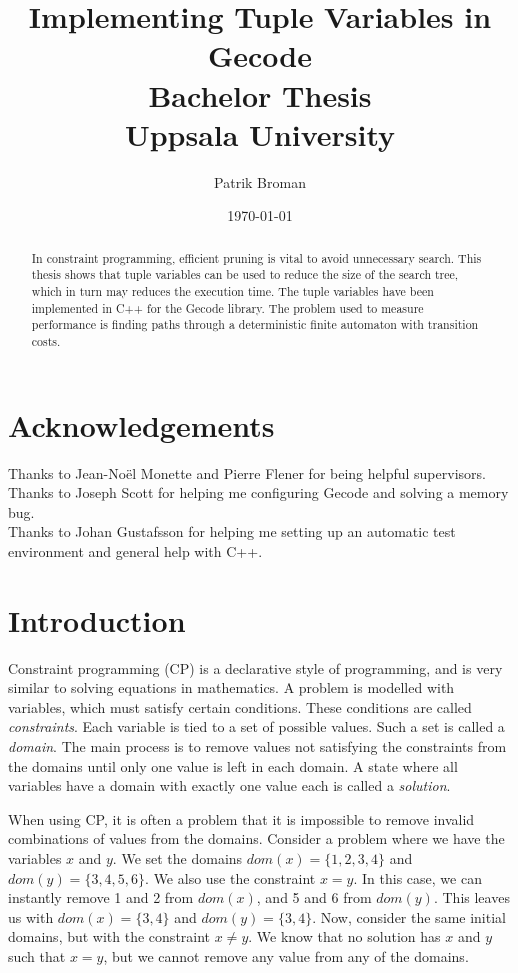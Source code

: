 \documentclass[a4paper,11pt]{article}
\title{\textbf{Implementing Tuple Variables in Gecode\\
	Bachelor Thesis \\
    Uppsala University  \\
  }
}
\author{Patrik Broman}
\date{\today}
\begin{document}
\maketitle
{}

\begin{abstract}

In constraint programming, efficient pruning is vital to avoid unnecessary search. This thesis shows that tuple variables can be used to reduce the size of the search tree, which in turn may reduces the execution time. The tuple variables have been implemented in C++ for the Gecode library. The problem used to measure performance is finding paths through a deterministic finite automaton with transition costs.

\end{abstract}

\setcounter{tocdepth}{2}
\tableofcontents
\pagestyle{plain}

\section*{Acknowledgements}
Thanks to Jean-No\"{e}l Monette and Pierre Flener for being helpful supervisors. \\
Thanks to Joseph Scott for helping me configuring Gecode and solving a memory bug. \\
Thanks to Johan Gustafsson for helping me setting up an automatic test environment and general help with C++. \\

\section{Introduction}
Constraint programming (CP) is a declarative style of programming, and is very similar to solving equations in mathematics. A problem is modelled with variables, which must satisfy certain conditions. These conditions are called \textit{constraints}. Each variable is tied to a set of possible values. Such a set is called a \textit{domain}. The main process is to remove values not satisfying the constraints from the domains until only one value is left in each domain. A state where all variables have a domain with exactly one value each is called a \textit{solution}.

When using CP, it is often a problem that it is impossible to remove invalid combinations of values from the domains. Consider a problem where we have the variables $x$ and $y$. We set the domains $\mathit{dom}(x)=\{1,2,3,4\}$ and $\mathit{dom}(y)=\{3,4,5,6\}$. We also use the constraint $x=y$. In this case, we can instantly remove 1 and 2 from $\mathit{dom}(x)$, and 5 and 6 from $\mathit{dom}(y)$. This leaves us with $\mathit{dom}(x)=\{3,4\}$ and $\mathit{dom}(y)=\{3,4\}$. Now, consider the same initial domains, but with the constraint $x\neq y$. We know that no solution has $x$ and $y$ such that $x=y$, but we cannot remove any value from any of the domains. 
\end{document}
